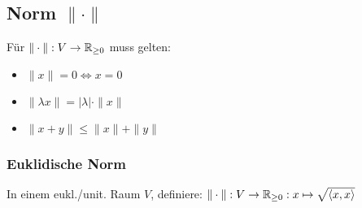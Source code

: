 \subsection*{Norm $\|\cdot\|$}
Für $\|\cdot\|:V\to\mathbb{R}_{\ge 0}$ muss gelten:
\begin{itemize}
	\item $\|x\| = 0 \iff x = 0$
	\item $\|\lambda x\|=|\lambda|\cdot\|x\|$
	\item $\|x+y\| \le \|x\| + \|y\|$
\end{itemize}

\subsubsection*{Euklidische Norm}
In einem eukl./unit. Raum $V$, definiere:
$\|\cdot\|: V\to\mathbb{R}_{\ge0}:x\mapsto \sqrt{\langle x,x \rangle}$
